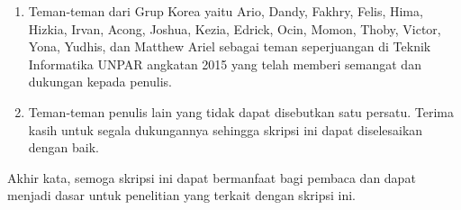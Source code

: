 {\begin{enumerate}
		\item Teman-teman dari Grup Korea yaitu Ario, Dandy, Fakhry, Felis, Hima, Hizkia, Irvan, Acong, Joshua, Kezia, Edrick, Ocin, Momon, Thoby, Victor, Yona, Yudhis, dan Matthew Ariel sebagai teman seperjuangan di Teknik Informatika UNPAR angkatan 2015 yang telah memberi semangat dan dukungan kepada penulis.
		\item Teman-teman penulis lain yang tidak dapat disebutkan satu persatu. Terima kasih untuk segala dukungannya sehingga skripsi ini dapat diselesaikan dengan baik.
	\end{enumerate}

Akhir kata, semoga skripsi ini dapat bermanfaat bagi pembaca dan dapat menjadi dasar untuk penelitian yang terkait dengan skripsi ini.} 


\renewcommand{\vtemplateauthor}{lionov}
\pgfplotsset{compat=newest}

\newcommand{\term}{\textit{term }}
\newcommand{\Term}{\textit{Term }}

\makeatletter
\renewcommand{\ALG@name}{Algoritma}
\makeatother



